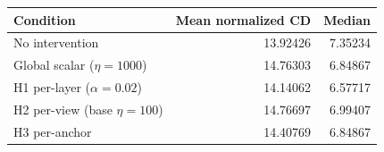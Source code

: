 \begin{tabular}{lrr}
\toprule
Condition & Mean normalized CD & Median \\
\midrule
No intervention & 13.92426 & 7.35234 \\
Global scalar ($\eta=1000$) & 14.76303 & 6.84867 \\
H1 per-layer ($\alpha=0.02$) & 14.14062 & 6.57717 \\
H2 per-view (base $\eta=100$) & 14.76697 & 6.99407 \\
H3 per-anchor & 14.40769 & 6.84867 \\
\bottomrule
\end{tabular}
